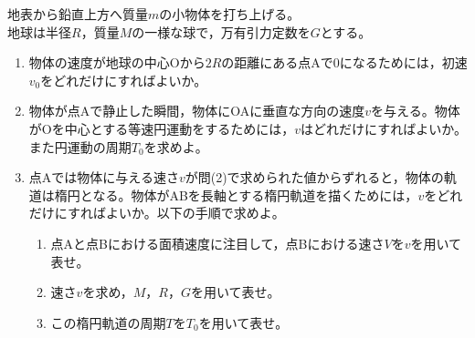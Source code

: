 \hakosyokika
\item
    \begin{mawarikomi}{150pt}{}
        地表から鉛直上方へ質量$m$の小物体を打ち上げる。\\
        地球は半径$R$，質量$M$の一様な球で，万有引力定数を$G$とする。
        \begin{enumerate}
            \item 物体の速度が地球の中心Oから$2R$の距離にある点Aで0になるためには，初速$v_0$をどれだけにすればよいか。
            \item 物体が点Aで静止した瞬間，物体にOAに垂直な方向の速度$v$を与える。物体がOを中心とする等速円運動をするためには，$v$はどれだけにすればよいか。また円運動の周期$T_0$を求めよ。
            \item 点Aでは物体に与える速さ$v$が問(2)で求められた値からずれると，物体の軌道は楕円となる。物体がABを長軸とする楕円軌道を描くためには，$v$をどれだけにすればよいか。以下の手順で求めよ。
            \begin{enumerate}
                \item 点Aと点Bにおける面積速度に注目して，点Bにおける速さ$V$を$v$を用いて表せ。
                \item 速さ$v$を求め，$M$，$R$，$G$を用いて表せ。
                \item この楕円軌道の周期$T$を$T_0$を用いて表せ。
            \end{enumerate}
        \end{enumerate}
    \end{mawarikomi}